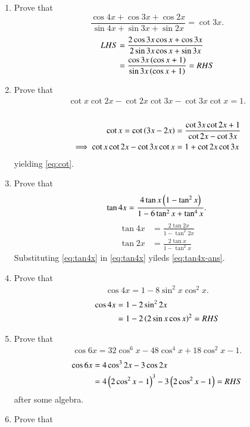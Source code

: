 \begin{enumerate}[label=\thesubsection.\arabic*,ref=\thesubsection.\theenumi,itemsep=1ex]
\item Prove that
$$\frac{\cos4x+\cos3x+\cos2x}{\sin4x+\sin3x+\sin2x}=\cot3x.$$
%
\solution
\begin{align}
LHS &= \frac{2\cos3x\cos x+\cos3x}{2\sin3x\cos x+\sin3x}
\\
&= \frac{\cos3x\left(\cos x+1\right)}{\sin3x\left(\cos x+1\right)}
=RHS
\end{align}
\item Prove that
\begin{align}
\cot x\cot2x-\cot2x\cot3x-\cot3x\cot x=1.
\label{eq:cot}
\end{align}
%
\\
\solution
\begin{align}
	\cot x  = \cot\left(3x-2x\right) &= \frac{\cot 3x \cot 2x +1}{\cot 2x - \cot 3x}
	\\
	\implies 
\cot x\cot2x-\cot3x\cot x &=1+\cot2x\cot3x
\end{align}
yielding  
\eqref{eq:cot}.
\item Prove that
\begin{align}
\tan4x=\frac{4\tan x\left(1-\tan^{2}x\right)}{1-6\tan^{2}x+\tan^{4}x}.
\label{eq:tan4x-ans}
\end{align}
%
\solution
\begin{align}
\label{eq:tan4x}
\tan 4x &= 
 \frac{2\tan 2x}{1-\tan^{2} 2x}
 \\
\tan 2x &= 
 \frac{2\tan x}{1-\tan^{2} x}
\label{eq:tan2x}
\end{align}
Substituting \eqref{eq:tan4x}
in \eqref{eq:tan4x}
yileds
\eqref{eq:tan4x-ans}.
\item Prove that
\begin{align}
\label{eq:cos4x}
\cos4x=1-8\sin^{2}x\cos^{2}x.
\end{align}
%
\solution
\begin{align}
	\cos 4x  &= 1 - 2 \sin^2 2x
	\\
	&=1 - 2 \left(2 \sin x \cos x\right)^2 = RHS
\end{align}
\item Prove that
\begin{align}
\label{eq:cos6x}
\cos6x=32\cos^{6}x-48\cos^{4}x+18\cos^{2}x-1.
\end{align}
%
\solution
\begin{align}
	\cos 6x&= 4 \cos^3 2x - 3 \cos 2x 
	\\
	&= 4 \left(2 \cos^2 x - 1\right)^3 - 3 \left(2\cos^2 x - 1\right) = RHS
\end{align}
after some algebra.
%
\item Prove that
\begin{enumerate}

\end{enumerate}
\end{enumerate}
